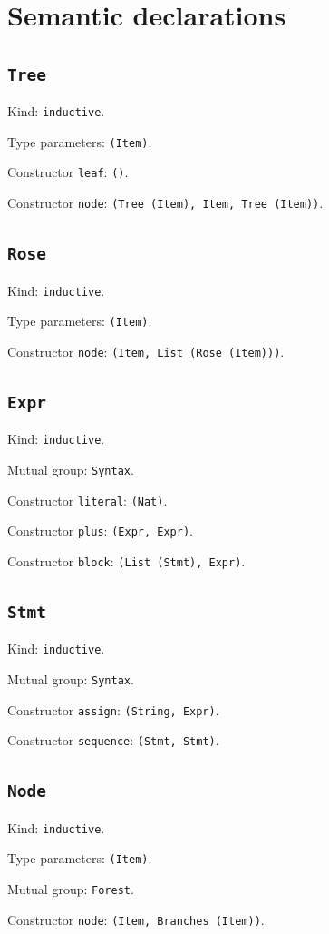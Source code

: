 \documentclass[11pt]{article}
\begin{document}
\section*{Semantic declarations}
\subsection*{\texttt{Tree}}
\noindent Kind: \texttt{inductive}.\par
\noindent Type parameters: \texttt{(Item)}.\par
\noindent Constructor \texttt{leaf}: \texttt{()}.\par
\noindent Constructor \texttt{node}: \texttt{(Tree (Item), Item, Tree (Item))}.\par
\subsection*{\texttt{Rose}}
\noindent Kind: \texttt{inductive}.\par
\noindent Type parameters: \texttt{(Item)}.\par
\noindent Constructor \texttt{node}: \texttt{(Item, List (Rose (Item)))}.\par
\subsection*{\texttt{Expr}}
\noindent Kind: \texttt{inductive}.\par
\noindent Mutual group: \texttt{Syntax}.\par
\noindent Constructor \texttt{literal}: \texttt{(Nat)}.\par
\noindent Constructor \texttt{plus}: \texttt{(Expr, Expr)}.\par
\noindent Constructor \texttt{block}: \texttt{(List (Stmt), Expr)}.\par
\subsection*{\texttt{Stmt}}
\noindent Kind: \texttt{inductive}.\par
\noindent Mutual group: \texttt{Syntax}.\par
\noindent Constructor \texttt{assign}: \texttt{(String, Expr)}.\par
\noindent Constructor \texttt{sequence}: \texttt{(Stmt, Stmt)}.\par
\subsection*{\texttt{Node}}
\noindent Kind: \texttt{inductive}.\par
\noindent Type parameters: \texttt{(Item)}.\par
\noindent Mutual group: \texttt{Forest}.\par
\noindent Constructor \texttt{node}: \texttt{(Item, Branches (Item))}.\par
\end{document}
